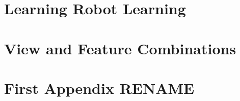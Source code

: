 \appendix

\chapter{Learning Robot Learning}


\chapter{View and Feature Combinations}



\chapter{First Appendix RENAME}
% 